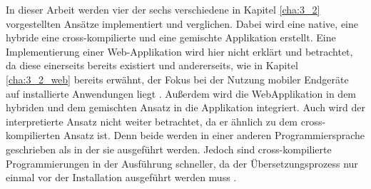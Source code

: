 In dieser Arbeit werden vier der sechs verschiedene in Kapitel \ref{cha:3_2} vorgestellten Ansätze implementiert und verglichen. Dabei wird eine native, eine hybride eine cross-kompilierte und eine gemischte Applikation erstellt. Eine Implementierung einer Web-Applikation wird hier nicht erklärt und betrachtet, da diese einerseits bereits existiert und andererseits, wie in Kapitel \ref{cha:3_2_web} bereits erwähnt, der Fokus bei der Nutzung mobiler Endgeräte auf installierte Anwendungen liegt \cite{report_webusage}. Außerdem wird die WebApplikation in dem hybriden und dem gemischten Ansatz in die Applikation integriert. Auch wird der interpretierte Ansatz nicht weiter betrachtet, da er ähnlich zu dem cross-kompilierten Ansatz ist. Denn beide werden in einer anderen Programmiersprache geschrieben als in der sie ausgeführt werden. Jedoch sind cross-kompilierte Programmierungen in der Ausführung schneller, da der Übersetzungsprozess nur einmal vor der Installation ausgeführt werden muss \cite{interpreted_vs_compiled}.
